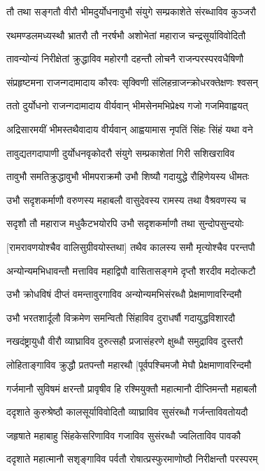 \twolineshloka
{तौ तथा सङ्गतौ वीरौ भीमदुर्योधनावुभौ}
{संयुगे सम्प्रकाशेते संरब्धाविव कुञ्जरौ}


\twolineshloka
{रथमण्डलमध्यस्थौ भ्रातरौ तौ नरर्षभौ}
{अशोभेतां महाराज चन्द्रसूर्याविवोदितौ}


\twolineshloka
{तावन्योन्यं निरीक्षेतां क्रुद्धाविव महोरगौ}
{दहन्तौ लोचनै राजन्परस्परवधैषिणौ}


\twolineshloka
{संप्रहृष्टमना राजन्गदामादाय कौरवः}
{सृक्विणी संलिहन्राजन्क्रोधरक्तेक्षणः श्वसन्}


\twolineshloka
{ततो दुर्योधनो राजन्गदामादाय वीर्यवान्}
{भीमसेनमभिप्रेक्ष्य गजो गजमिवाह्वयत्}


\twolineshloka
{अद्रिसारमयीं भीमस्तथैवादाय वीर्यवान्}
{आह्वयामास नृपतिं सिंहः सिंहं यथा वने}


\twolineshloka
{तावुद्यतगदापाणी दुर्योधनवृकोदरौ}
{संयुगे सम्प्रकाशेतां गिरी सशिखराविव}


\twolineshloka
{तावुभौ समतिक्रुद्धावुभौ भीमपराक्रमौ}
{उभौ शिष्यौ गदायुद्धे रौहिणेयस्य धीमतः}


\twolineshloka
{उभौ सदृशकर्माणौ वरुणस्य महाबलौ}
{वासुदेवस्य रामस्य तथा वैश्रवणस्य च}


\twolineshloka
{सदृशौ तौ महाराज मधुकैटभयोरपि}
{उभौ सदृशकर्माणौ तथा सुन्दोपसुन्दयोः}


\twolineshloka
{[रामरावणयोश्चैव वालिसुग्रीवयोस्तथा]}
{तथैव कालस्य समौ मृत्योश्चैव परन्तपौ}


\twolineshloka
{अन्योन्यमभिधावन्तौ मत्ताविव महाद्विपौ}
{वासितासङ्गमे दृप्तौ शरदीव मदोत्कटौ}


\twolineshloka
{उभौ क्रोधविषं दीप्तं वमन्तावुरगाविव}
{अन्योन्यमभिसंरब्धौ प्रेक्षमाणावरिन्दमौ}


\twolineshloka
{उभौ भरतशार्दूलौ विक्रमेण समन्वितौ}
{सिंहाविव दुराधर्षौ गदायुद्धविशारदौ}


\twolineshloka
{नखदंष्ट्रायुधौ वीरौ व्याघ्राविव दुरुत्सहौ}
{प्रजासंहरणे क्षुब्धौ समुद्राविव दुस्तरौ}


\twolineshloka
{लोहिताङ्गाविव क्रुद्धौ प्रतपन्तौ महारथौ}
{[पूर्वपश्चिमजौ मेघौ प्रेक्षमाणावरिन्दमौ}


\twolineshloka
{गर्जमानौ सुविषमं क्षरन्तौ प्रावृषीव हि}
{रश्मियुक्तौ महात्मानौ दीप्तिमन्तौ महाबलौ}


\twolineshloka
{ददृशाते कुरुश्रेष्ठौ कालसूर्याविवोदितौ}
{व्याघ्राविव सुसंरब्धौ गर्जन्ताविवतोयदौ}


\twolineshloka
{जहृषाते महाबाहु सिंहकेसरिणाविव}
{गजाविव सुसंरब्धौ ज्वलिताविव पावकौ}


\twolineshloka
{ददृशाते महात्मानौ सशृङ्गाविव पर्वतौ}
{रोषात्प्रस्फुरमाणोष्ठौ निरीक्षन्तौ परस्परम्}


